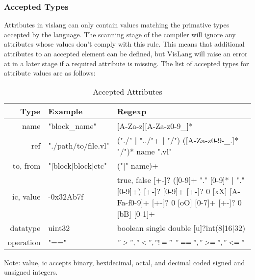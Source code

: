 \subsubsection{Accepted Types}
Attributes in vislang can only contain values matching the primative types accepted by the language.
The scanning stage of the compiler will ignore any attributes whose values don't comply with this rule.
This means that additional attributes to an accepted element can be defined, but VisLang will raise an error at in a later stage if a required attribute is missing.
The list of accepted types for attribute values are as follows:

\begin{longtable}[c]{ |r|l|l| }
    \caption{Accepted Attributes}
    \label{table:attr}
    \hline
    Type & Example & Regexp  \\
    \hline
    \hline
    name & "block\_name" & [A-Za-z][A-Za-z0-9\_]* \\
    \hline
    ref & "./path/to/file.vl" & \specialcell{("./" $|$ "../"+ $|$ "/") \\
                                        ([A-Za-z0-9-\_.]* "/")* name ".vl"} \\
    \hline
    to, from & "$|$block$|$block$|$etc" & ("$|$" name)+ \\
    \hline
    ic, value & -0x32Ab7f & \specialcell{true, false \\ {[+-]}? ([0-9]+ "." [0-9]* $|$ "." [0-9]+) \\
                                                        {[+-]}? [0-9]+ \\
                                                      {[+-]}? 0 [xX] [A-Fa-f0-9]+ \\
                                                      {[+-]}? 0 [oO] [0-7]+ \\
                                                  {[+-]}? 0 [bB] [0-1]+ } \\
    \hline
    datatype & uint32 & \specialcell{boolean \\ single \\ double \\ 
                                    {[u]}?int(8$|$16$|$32)} \\
    \hline
    operation & "==" & \specialcell{$">", "<", "!="$ \\ $"==", ">=", "<="$} \\
    \hline
\end{longtable}
Note: value, ic accepts binary, hexidecimal, octal, and decimal coded signed and unsigned 
integers.

